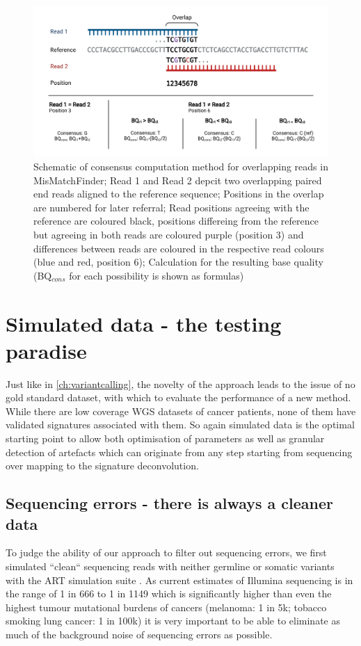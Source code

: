 \begin{figure}[!ht]
\centering
\includegraphics[width=.99\linewidth]{Figures/ConsensusMethodMisMatchFinder.pdf}
\caption[Schematic of consensus computation method for overlapping reads]{Schematic of consensus computation method for overlapping reads in MisMatchFinder; Read 1 and Read 2 depcit two overlapping paired end reads aligned to the reference sequence; Positions in the overlap are numbered for later referral; Read positions agreeing with the reference are coloured black, positions differeing from the reference but agreeing in both reads are coloured purple (position 3) and differences between reads are coloured in the respective read colours (blue and red, position 6); Calculation for the resulting base quality (BQ$_{cons}$ for each possibility is shown as formulas)}\label{fig:mmf-consensus}
\end{figure}


\section{Simulated data - the testing paradise}
\label{mmf-sec:simulated data}
Just like in \autoref{ch:variantcalling}, the novelty of the approach leads to the issue of no gold standard dataset, with which to evaluate the performance of a new method. While there are low coverage WGS datasets of cancer patients, none of them have validated signatures associated with them. So again simulated data is the optimal starting point to allow both optimisation of parameters as well as granular detection of artefacts which can originate from any step starting from sequencing over mapping to the signature deconvolution. 

\subsection{Sequencing errors - there is always a cleaner data}
\label{mmf-sec:cleanSim}
To judge the ability of our approach to filter out sequencing errors, we first simulated ``clean`` sequencing reads with neither germline or somatic variants with the ART simulation suite \cite{Huang2011}. As current estimates of Illumina sequencing is in the range of 1 in 666 to 1 in 1149 \cite{Stoler2021} which is significantly higher than even the highest tumour mutational burdens of  cancers (melanoma: 1 in 5k; tobacco smoking lung cancer: 1 in 100k) it is very important to be able to eliminate as much of the  background noise of sequencing errors as possible.

